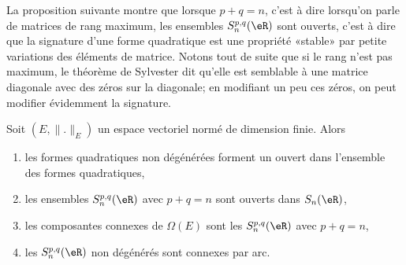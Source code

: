 La proposition suivante montre que lorsque \( p+q=n\), c'est à dire lorsqu'on parle de matrices de rang maximum, les ensembles \( S_n^{p,q}(\eR)\) sont ouverts, c'est à dire que la signature d'une forme quadratique est une propriété «stable» par petite variations des éléments de matrice. Notons tout de suite que si le rang n'est pas maximum, le théorème de Sylvester dit qu'elle est semblable à une matrice diagonale avec des zéros sur la diagonale; en modifiant un peu ces zéros, on peut modifier évidemment la signature.
\begin{proposition} \label{PropNPbnsMd}
    Soit \( (E,\| . \|_{E})\) un espace vectoriel normé de dimension finie. Alors
    \begin{enumerate}
        \item
            les formes quadratiques non dégénérées forment un ouvert dans l'ensemble des formes quadratiques,
        \item
            les ensembles \( S_n^{p,q}(\eR)\) avec \( p+q=n\) sont ouverts dans \( S_n(\eR)\),
        \item   \label{ItemGOhRIiViii}
            les composantes connexes de \( \Omega(E)\) sont les \( S_n^{p,q}(\eR)\) avec \( p+q=n\),
        \item   \label{ItemGOhRIiViv}
            les \( S_n^{p,q}(\eR)\) non dégénérés sont connexes par arc.
    \end{enumerate}
\end{proposition}

